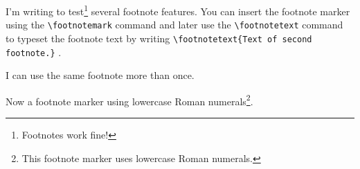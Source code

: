\documentclass{article}
\begin{document}
	I'm writing to test\footnote{Footnotes work fine!} several footnote features. 
	You can insert the footnote marker\footnotemark{} using the \verb|\footnotemark|
	command and later use the \verb|\footnotetext| command to typeset the footnote
	text by writing \verb||
	\footnotetext{Text of second footnote.}.
	
	I can use the same footnote\footnotemark{} more than 
	once\footnotemark[\value{footnote}].
	
	
	\renewcommand{\thefootnote}{\roman{footnote}}
	Now a footnote marker using lowercase Roman numerals\footnote{This footnote marker uses lowercase Roman numerals.}.
\end{document}
